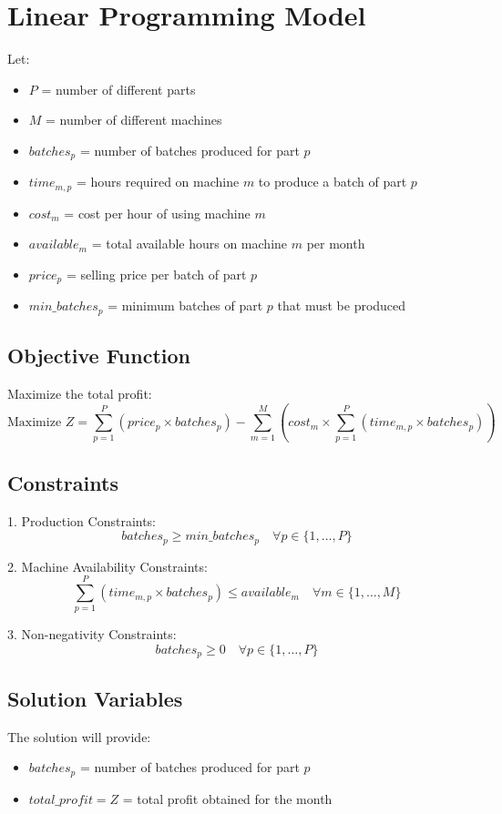 \documentclass{article}
\begin{document}
\section*{Linear Programming Model}

Let:
\begin{itemize}
    \item \( P \) = number of different parts
    \item \( M \) = number of different machines
    \item \( batches_p \) = number of batches produced for part \( p \)
    \item \( time_{m,p} \) = hours required on machine \( m \) to produce a batch of part \( p \)
    \item \( cost_m \) = cost per hour of using machine \( m \)
    \item \( available_m \) = total available hours on machine \( m \) per month
    \item \( price_p \) = selling price per batch of part \( p \)
    \item \( min\_batches_p \) = minimum batches of part \( p \) that must be produced
\end{itemize}

\subsection*{Objective Function}
Maximize the total profit:
\[
\text{Maximize } Z = \sum_{p=1}^{P} (price_p \times batches_p) - \sum_{m=1}^{M} \left( cost_m \times \sum_{p=1}^{P} (time_{m,p} \times batches_p) \right)
\]

\subsection*{Constraints}
1. Production Constraints:
   \[
   batches_p \geq min\_batches_p \quad \forall p \in \{1, \ldots, P\}
   \]
   
2. Machine Availability Constraints:
   \[
   \sum_{p=1}^{P} (time_{m,p} \times batches_p) \leq available_m \quad \forall m \in \{1, \ldots, M\}
   \]

3. Non-negativity Constraints:
   \[
   batches_p \geq 0 \quad \forall p \in \{1, \ldots, P\}
   \]

\subsection*{Solution Variables}
The solution will provide:
\begin{itemize}
    \item \( batches_p \) = number of batches produced for part \( p \)
    \item \( total\_profit = Z \) = total profit obtained for the month
\end{itemize}
\end{document}
